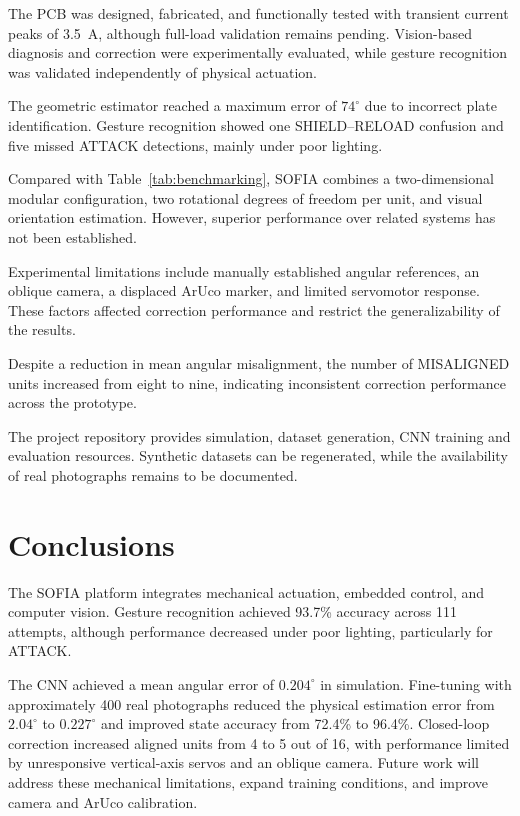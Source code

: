 \documentclass[lettersize,journal]{IEEEtran}
\begin{document}
	The PCB was designed, fabricated, and
	functionally tested with transient current
	peaks of 3.5~A, although full-load
	validation remains pending. Vision-based
	diagnosis and correction were experimentally
	evaluated, while gesture recognition was
	validated independently of physical actuation.
	
	The geometric estimator reached a maximum
	error of $74^\circ$ due to incorrect plate
	identification. Gesture recognition showed
	one SHIELD--RELOAD confusion and five
	missed ATTACK detections, mainly under
	poor lighting.
	
	Compared with Table~\ref{tab:benchmarking},
	SOFIA combines a two-dimensional modular
	configuration, two rotational degrees of
	freedom per unit, and visual orientation
	estimation. However, superior performance
	over related systems has not been established.
	
	Experimental limitations include manually
	established angular references, an oblique
	camera, a displaced ArUco marker, and
	limited servomotor response. These factors
	affected correction performance and
	restrict the generalizability of the results.
	
	Despite a reduction in mean angular
	misalignment, the number of MISALIGNED
	units increased from eight to nine,
	indicating inconsistent correction
	performance across the prototype.
	
	The project repository provides simulation,
	dataset generation, CNN training and
	evaluation resources. Synthetic datasets
	can be regenerated, while the availability
	of real photographs remains to be documented.
	
	
	\section{Conclusions}
	\label{sec:conclusions}
	

The SOFIA platform integrates mechanical actuation,
embedded control, and computer vision. Gesture
recognition achieved 93.7\% accuracy across 111
attempts, although performance decreased under
poor lighting, particularly for ATTACK.

The CNN achieved a mean angular error of
$0.204^\circ$ in simulation. Fine-tuning with
approximately 400 real photographs reduced
the physical estimation error from $2.04^\circ$
to $0.227^\circ$ and improved state accuracy
from 72.4\% to 96.4\%. Closed-loop correction
increased aligned units from 4 to 5 out of 16,
with performance limited by unresponsive
vertical-axis servos and an oblique camera.
Future work will address these mechanical
limitations, expand training conditions, and
improve camera and ArUco calibration.
\end{document}

